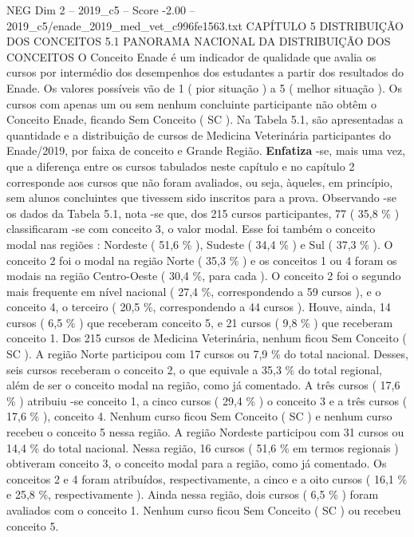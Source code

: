 \begin{textsample}{NEG Dim 2 – 2019\_c5 – Score -2.00 – 2019\_c5/enade\_2019\_med\_vet\_c996fe1563.txt}  \label{ex:f2_neg_099}
CAPÍTULO 5 DISTRIBUIÇÃO DOS CONCEITOS 5.1 PANORAMA NACIONAL DA DISTRIBUIÇÃO DOS CONCEITOS O Conceito Enade é um indicador de qualidade que avalia os cursos por intermédio dos desempenhos dos estudantes a partir dos resultados do Enade.
Os valores possíveis vão de 1 ( pior situação ) a 5 ( melhor situação ).
Os cursos com apenas um ou sem nenhum concluinte participante não obtêm o Conceito Enade, ficando Sem Conceito ( SC ).
Na Tabela 5.1, são apresentadas a quantidade e a distribuição de cursos de Medicina Veterinária participantes do Enade/2019, por faixa de conceito e Grande Região. \textbf{Enfatiza} -se, mais uma vez, que a diferença entre os cursos tabulados neste capítulo e no capítulo 2 corresponde aos cursos que não foram avaliados, ou seja, àqueles, em princípio, sem alunos concluintes que tivessem sido inscritos para a prova.
Observando -se os dados da Tabela 5.1, nota -se que, dos 215 cursos participantes, 77 ( 35,8 \% ) classificaram -se com conceito 3, o valor modal.
Esse foi também o conceito modal nas regiões : Nordeste ( 51,6 \% ), Sudeste ( 34,4 \% ) e Sul ( 37,3 \% ).
O conceito 2 foi o modal na região Norte ( 35,3 \% ) e os conceitos 1 ou 4 foram os modais na região Centro-Oeste ( 30,4 \%, para cada ).
O conceito 2 foi o segundo mais frequente em nível nacional ( 27,4 \%, correspondendo a 59 cursos ), e o conceito 4, o terceiro ( 20,5 \%, correspondendo a 44 cursos ).
Houve, ainda, 14 cursos ( 6,5 \% ) que receberam conceito 5, e 21 cursos ( 9,8 \% ) que receberam conceito 1.
Dos 215 cursos de Medicina Veterinária, nenhum ficou Sem Conceito ( SC ).
A região Norte participou com 17 cursos ou 7,9 \% do total nacional.
Desses, seis cursos receberam o conceito 2, o que equivale a 35,3 \% do total regional, além de ser o conceito modal na região, como já comentado.
A três cursos ( 17,6 \% ) atribuiu -se conceito 1, a cinco cursos ( 29,4 \% ) o conceito 3 e a três cursos ( 17,6 \% ), conceito 4.
Nenhum curso ficou Sem Conceito ( SC ) e nenhum curso recebeu o conceito 5 nessa região.
A região Nordeste participou com 31 cursos ou 14,4 \% do total nacional.
Nessa região, 16 cursos ( 51,6 \% em termos regionais ) obtiveram conceito 3, o conceito modal para a região, como já comentado.
Os conceitos 2 e 4 foram atribuídos, respectivamente, a cinco e a oito cursos ( 16,1 \% e 25,8 \%, respectivamente ).
Ainda nessa região, dois cursos ( 6,5 \% ) foram avaliados com o conceito 1.
Nenhum curso ficou Sem Conceito ( SC ) ou recebeu conceito 5.

\end{textsample}
